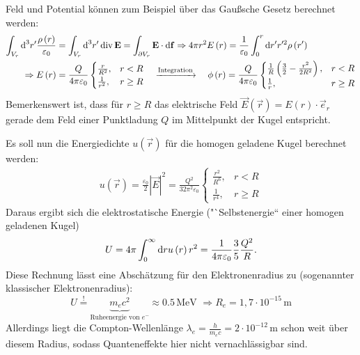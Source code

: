Feld und Potential können zum Beispiel über das Gaußsche Gesetz berechnet werden:
\begin{align*}
		\int _{{V_{r}}}\text{d} ^{3}r'\frac{\rho \left(r\right)}{\varepsilon _{0}}&=\int _{{V_{r}}}\text{d} ^{3}r'\operatorname{div} \mathbf{E}=\int _{\partial {V_{r}}}\mathbf{E}\cdot \text{d} \mathbf{f}\Rightarrow 4\pi r^{2}E\left(r\right)=\frac{1}{\varepsilon _{0}}\int _{0}^{r}\text{d} r'r'^{2}\rho \left(r'\right) \\
		\Rightarrow E\left(r\right)&=\frac{Q}{4\pi \varepsilon _{0}}\begin{cases} \frac{r}{R^{2}}, & r<R     \\
              \frac{1}{r^{2}}, & r\geq R
		                                                           \end{cases} \quad\xrightarrow{\text{Integration}}\quad \phi \left(r\right)=\frac{Q}{4\pi \varepsilon _{0}}\begin{cases} \frac{1}{R}\left(\frac{3}{2}-\frac{r^{2}}{2R^{2}}\right), & r<R     \\
              \frac{1}{r},                                              & r\geq R
		                                                                                                                                                                     \end{cases}
\end{align*}
Bemerkenswert ist, dass für $r\geq R$ das elektrische Feld $\vec {E}\left(\vec {r}\right)=E\left(r\right)\cdot \vec {e}_{r}$ gerade dem Feld einer Punktladung $Q$ im Mittelpunkt der Kugel entspricht.

Es soll nun die Energiedichte $u\left(\vec {r}\right)$ für die homogen geladene Kugel berechnet werden:
\begin{align*}
	u\left(\vec {r}\right)=\frac{\varepsilon _{0}}{2}\left| \vec {E}\right| ^{2}=\frac{Q^{2}}{32\pi ^{2}\varepsilon _{0}}\begin{cases} \frac{r^{2}}{R^{6}}, & r<R     \\
              \frac{1}{r^{4}},     & r\geq R
	                                                                                                                     \end{cases}
\end{align*}
Daraus ergibt sich die elektrostatische Energie ("`Selbstenergie`` einer homogen geladenen Kugel)
\begin{equation*}
	U=4\pi \int _{0}^{\infty }\text{d} ru\left(r\right)r^{2}=\frac{1}{4\pi \varepsilon _{0}}\frac{3}{5}\frac{Q^{2}}{R}.
\end{equation*}
Diese Rechnung lässt eine Abschätzung für den Elektronenradius zu (sogenannter klassischer Elektronenradius):
\begin{equation*}
	U\overset{!}{=}\underset{\text{Ruheenergie von }e^{-}}{\underbrace{m_{e}c^{2}}}\approx 0.5\,\text{MeV }\Rightarrow R_{e}=1,7\cdot 10^{-15}\,\mathrm{m}
\end{equation*}
Allerdings liegt die Compton-Wellenlänge $\lambda _{e}=\frac{h}{m_{e}c}=2\cdot 10^{-12}\,\mathrm{m}$ schon weit über diesem Radius, sodass Quanteneffekte hier nicht vernachlässigbar sind.

